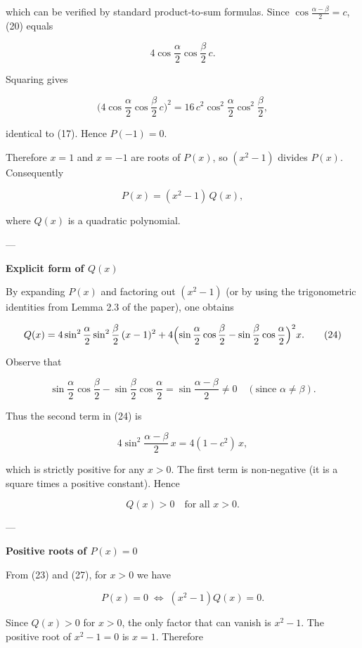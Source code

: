 \documentclass{article}
\begin{document}
which can be verified by standard product‑to‑sum formulas. Since \(\cos\frac{\alpha-\beta}{2}=c\), (20) equals  

\[
4\cos\frac{\alpha}{2}\cos\frac{\beta}{2}\,c. \tag{21}
\]  

Squaring gives  

\[
\bigl(4\cos\frac{\alpha}{2}\cos\frac{\beta}{2}\,c\bigr)^{2}=16\,c^{2}\cos^{2}\frac{\alpha}{2}\cos^{2}\frac{\beta}{2}, \tag{22}
\]  

identical to (17). Hence \(P(-1)=0\).

Therefore \(x=1\) and \(x=-1\) are roots of \(P(x)\), so \((x^{2}-1)\) divides \(P(x)\). Consequently  

\[
P(x)=(x^{2}-1)\,Q(x), \tag{23}
\]  

where \(Q(x)\) is a quadratic polynomial.

---

\noindent\textbf{Explicit form of \(Q(x)\)}  

By expanding \(P(x)\) and factoring out \((x^{2}-1)\) (or by using the trigonometric identities from Lemma 2.3 of the paper), one obtains  

\[
Q(x)=4\sin^{2}\frac{\alpha}{2}\sin^{2}\frac{\beta}{2}\,(x-1)^{2}+4\Bigl(\sin\frac{\alpha}{2}\cos\frac{\beta}{2}-\sin\frac{\beta}{2}\cos\frac{\alpha}{2}\Bigr)^{2}x. \tag{24}
\]  

Observe that  

\[
\sin\frac{\alpha}{2}\cos\frac{\beta}{2}-\sin\frac{\beta}{2}\cos\frac{\alpha}{2}=\sin\frac{\alpha-\beta}{2}\neq0 \quad (\text{since }\alpha\neq\beta). \tag{25}
\]  

Thus the second term in (24) is  

\[
4\sin^{2}\frac{\alpha-\beta}{2}\,x = 4(1-c^{2})\,x, \tag{26}
\]  

which is strictly positive for any \(x>0\). The first term is non‑negative (it is a square times a positive constant). Hence  

\[
Q(x)>0 \quad \text{for all } x>0. \tag{27}
\]  

---

\noindent\textbf{Positive roots of \(P(x)=0\)}  

From (23) and (27), for \(x>0\) we have  

\[
P(x)=0 \;\Longleftrightarrow\; (x^{2}-1)Q(x)=0. \tag{28}
\]  

Since \(Q(x)>0\) for \(x>0\), the only factor that can vanish is \(x^{2}-1\). The positive root of \(x^{2}-1=0\) is \(x=1\). Therefore  
\end{document}
